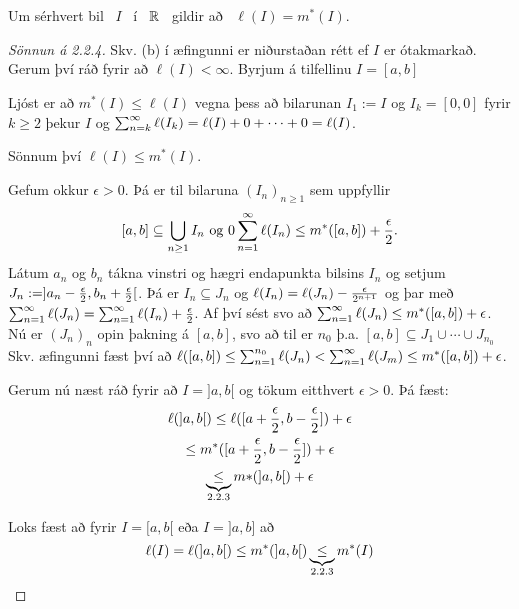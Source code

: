 \documentclass[12pt]{report}
\begin{document}
\section*{}
\begin{setn*}

Um sérhvert bil \ $I$ \ í \ $\mathbb{R}$ \ gildir að \ $\ell(I) = m^*(I)$.
\end{setn*}
\begin{proof}[Sönnun á 2.2.4]
  Skv. (b) í æfingunni er niðurstaðan rétt ef $I$ er ótakmarkað. Gerum
  því ráð fyrir að $\ell(I) < \infty$. Byrjum á tilfellinu $I = [a,b]$

    \begin{ath}
      Ljóst er að $m^{*}(I) \leq \ell(I)$ vegna þess að bilarunan
      $I_1 := I$ og $I_k = [0,0]$ fyrir $k \geq 2$ þekur $I$ og
      $\sum_{n = {k}}^{\infty} \ell(I_k) = \ell(I) + 0 + \dotsb + 0 = \ell(I)$.
        
      Sönnum því $\ell(I) \leq m^{*} (I)$.
    \end{ath}
    Gefum okkur $\epsilon > 0$. Þá er til bilaruna $(I_n)_{n \geq 1}$
    sem uppfyllir
    \[[a,b] \subseteq \bigcup_{n \geq 1} I_n \text{ og } 0 \sum_{n = 1}^{\infty}
    \ell(I_n) \leq m^{*}([a,b]) + \frac{\epsilon}{2}.\]
    Látum $a_n$ og $b_n$ tákna vinstri og hægri endapunkta bilsins
    $I_n$ og setjum $J_n := ]a_n - \frac{\epsilon}{2}, b_n + \frac{\epsilon}{2}[$.  Þá er
    $I_n \subseteq J_n$ og $\ell(I_n) = \ell(J_n) - \frac{\epsilon}{2^{n+1}}$ og
    þar með $\sum_{n = 1}^{\infty} \ell(J_n) = \sum_{n = 1}^{\infty} \ell(I_n) + \frac{\epsilon}{2}$.
    Af því sést svo að
    $\sum_{n = 1}^{\infty} \ell(J_n) \leq m^{*}([a,b]) + \epsilon$.  Nú er
    $(J_n)_n$ opin þakning á $[a,b]$, svo að til er $n_0$ þ.a.
    $[a,b] \subseteq J_1 \cup \dotsb \cup J_{n_0}$ Skv. æfingunni fæst
    því að
    $\ell([a,b]) \leq \sum_{n =1}^{n_0} \ell(J_n) < \sum_{n = 1}^{\infty}
    \ell(J_m) \leq m^{*} ([a,b]) + \epsilon$.

    Gerum nú næst ráð fyrir að $I = ]a,b[$ og tökum eitthvert
    $\epsilon > 0$. Þá fæst:
    \begin{gather*}
      \ell(]a,b[)  \leq \ell([a + \frac{\epsilon}{2}, b - \frac{\epsilon}{2}]) + \epsilon \\
      \leq m^{*}([a + \frac{\epsilon}{2}, b - \frac{\epsilon}{2}]) + \epsilon \\
      \underbrace{\leq}_{\text{2.2.3}} m{*}(]a,b[) + \epsilon
    \end{gather*}


    Loks fæst að fyrir $I = [a,b[$ eða $I = ]a,b]$ að
    \[\ell(I) = \ell(]a,b[) \leq m^*(]a,b[) \underbrace{\leq}_{\text{2.2.3}} m^*(I)\]
  \end{proof}
\end{document}
